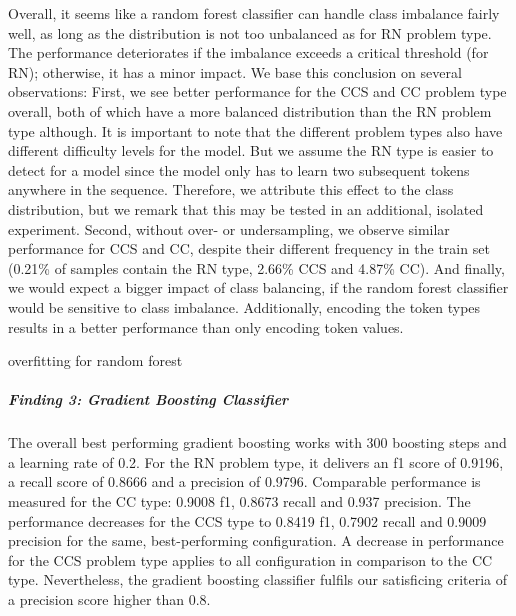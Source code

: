 Overall, it seems like a random forest classifier can handle class imbalance fairly well, as long as the distribution is not too unbalanced as for RN problem type. The performance deteriorates if the imbalance exceeds a critical threshold (for RN); otherwise, it has a minor impact.
We base this conclusion on several observations: First, we see better performance for the CCS and CC problem type overall, both of which have a more balanced distribution than the RN problem type although. It is important to note that the different problem types also have different difficulty levels for the model. But we assume the RN type is easier to detect for a model since the model only has to learn two subsequent tokens anywhere in the sequence. Therefore, we attribute this effect to the class distribution, but we remark that this may be tested in an additional, isolated experiment. Second, without over- or undersampling, we observe similar performance for CCS and CC, despite their different frequency in the train set (0.21\% of samples contain the RN type, 2.66\% CCS and 4.87\% CC). And finally, we would expect a bigger impact of class balancing, if the random forest classifier would be sensitive to class imbalance.
Additionally, encoding the token types results in a better performance than only encoding token values.

overfitting for random forest

\subparagraph{Finding 3: Gradient Boosting Classifier}
The overall best performing gradient boosting works with 300 boosting steps and a learning rate of 0.2. For the RN problem type, it delivers an f1 score of 0.9196, a recall score of 0.8666 and a precision of 0.9796. Comparable performance is measured for the CC type: 0.9008 f1, 0.8673 recall and 0.937 precision. The performance decreases for the CCS type to 0.8419 f1, 0.7902 recall and 0.9009 precision for the same, best-performing configuration. A decrease in performance for the CCS problem type applies to all configuration in comparison to the CC type. Nevertheless, the gradient boosting classifier fulfils our satisficing criteria of a precision score higher than 0.8.

